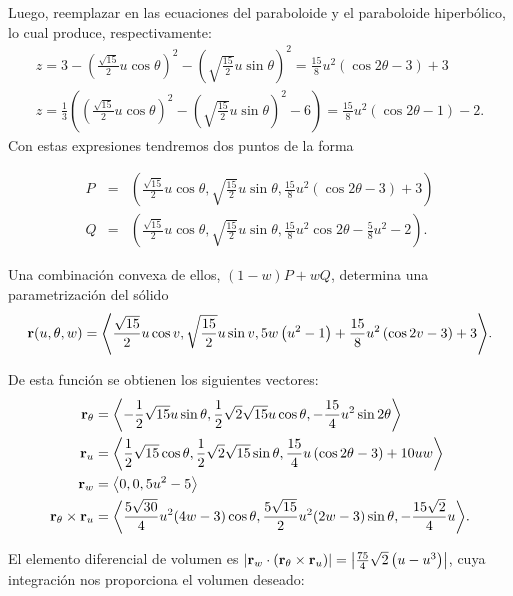 \begin{parrafonumerado}
Luego, reemplazar en las ecuaciones del paraboloide y el paraboloide hiperbólico, lo cual produce, respectivamente:
%
{\small
\begin{multline*}
  z = 3-\left( \frac{\sqrt{15}}{2}u\cos \theta \right) ^2 -\left( \sqrt{\frac{15}{2}}u\sin \theta \right) ^2  = \frac{15}{8}u^{2}(\cos 2\theta -3)+3 \\
  z =  \frac{1}{3}\left( \left( \frac{\sqrt{15}}{2}u\cos \theta \right)^2-\left( \sqrt{\frac{15}{2}}u\sin \theta \right) ^2 -6\right) =  \frac{15}{8}u^{2}(\cos 2\theta -1)-2.
\end{multline*}
}
%
Con estas expresiones tendremos dos puntos de la forma

{\small
\begin{eqnarray*}
  P& =&\left( \frac{\sqrt{15}}{2}u\cos \theta,\sqrt{\frac{15}{2}}u\sin \theta , \frac{15}{8}u^{2}(\cos 2\theta -3)+3\right) \\
  Q&=&\left( \frac{\sqrt{15}}{2}u\cos \theta,\sqrt{\frac{15}{2}}u\sin \theta,\frac{15}{8}u^{2}\cos 2\theta-\frac{5}{8}u^{2}-2\right)\!.
\end{eqnarray*}
}

Una combinación convexa de ellos, $(1-w)P+wQ$, determina una parametrización del sólido
%
{\small
\[{\bf r}(u,\theta,w) = \left\langle \frac{\sqrt{15}}{2}u\cos v,\sqrt{\frac{15}{2}}u\sin v,5w\left( u^{2}-1\right) +\frac{15}{8}u^{2}\left(\cos2v-3\right) +3 \right\rangle\!.\]
}

De esta función se obtienen los siguientes vectores:
{\small
\begin{align*}
  {\bf r}_{\theta } &= \left\langle -\frac{1}{2}\sqrt{15}u\sin \theta ,\frac{1}{2}%
  \sqrt{2}\sqrt{15}u\cos \theta ,-\frac{15}{4}u^{2}\sin 2\theta \right\rangle \\
  {\bf r}_{u} &= \left\langle \frac{1}{2}\sqrt{15}\cos \theta ,\frac{1}{2}\sqrt{2} \sqrt{15}\sin \theta ,\frac{15}{4}u\left( \cos 2\theta -3\right) +10uw \right\rangle \\
  {\bf r}_{w} &= \left\langle 0,0,5u^{2}-5\right\rangle \\
  {\bf r}_{\theta }\times {\bf r}_{u} &= \left\langle \frac{5\sqrt{30}}{4} u^{2} (4w-3) \cos \theta ,\frac{5\sqrt{15}}{2}u^{2}(2w-3) \sin \theta ,-\frac{15\sqrt{2}}{4}u \right\rangle\!.
\end{align*}
}

El elemento diferencial de volumen es
$\left\vert {\bf r}_{w}\cdot \left({\bf r}_{\theta }\times {\bf r}_{u}\right) \right\vert
=  \left\vert \frac{75}{4}\sqrt{2}\left( u-u^{3}\right) \right\vert $,
cuya integración nos proporciona el volumen deseado:


\end{parrafonumerado}
